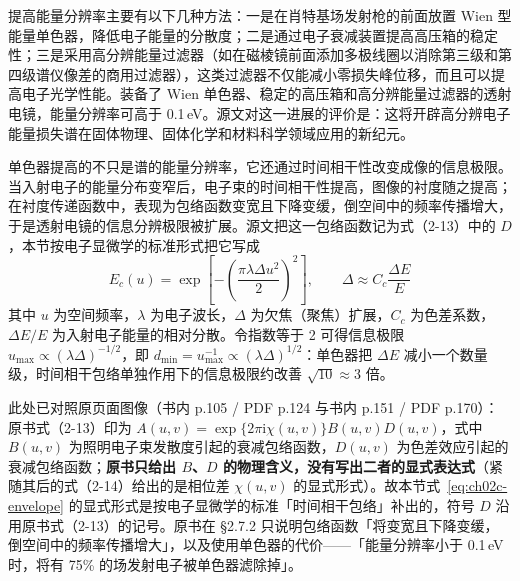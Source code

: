 提高能量分辨率主要有以下几种方法：一是在肖特基场发射枪的前面放置 Wien 型能量单色器，降低电子能量的分散度；二是通过电子衰减装置提高高压箱的稳定性；三是采用高分辨能量过滤器（如在磁棱镜前面添加多极线圈以消除第三级和第四级谱仪像差的商用过滤器），这类过滤器不仅能减小零损失峰位移，而且可以提高电子光学性能。装备了 Wien 单色器、稳定的高压箱和高分辨能量过滤器的透射电镜，能量分辨率可高于 0.1\,eV。源文对这一进展的评价是：这将开辟高分辨电子能量损失谱在固体物理、固体化学和材料科学领域应用的新纪元。

\begin{principle}
单色器提高的不只是谱的能量分辨率，它还通过时间相干性改变成像的信息极限。当入射电子的能量分布变窄后，电子束的时间相干性提高，图像的衬度随之提高；在衬度传递函数中，表现为包络函数变宽且下降变缓，倒空间中的频率传播增大，于是透射电镜的信息分辨极限被扩展。源文把这一包络函数记为式（2-13）中的 $D$，本节按电子显微学的标准形式把它写成
\begin{equation}
E_c(u)=\exp\!\left[-\left(\frac{\pi\lambda\Delta u^{2}}{2}\right)^{2}\right],
\qquad
\Delta \approx C_c\frac{\Delta E}{E}
\label{eq:ch02c-envelope}
\end{equation}
其中 $u$ 为空间频率，$\lambda$ 为电子波长，$\Delta$ 为欠焦（聚焦）扩展，$C_c$ 为色差系数，$\Delta E/E$ 为入射电子能量的相对分散。令指数等于 2 可得信息极限 $u_{\max}\propto(\lambda\Delta)^{-1/2}$，即 $d_{\min}=u_{\max}^{-1}\propto(\lambda\Delta)^{1/2}$：单色器把 $\Delta E$ 减小一个数量级，时间相干包络单独作用下的信息极限约改善 $\sqrt{10}\approx 3$ 倍。
\end{principle}

此处已对照原页面图像（书内 p.105 / PDF p.124 与书内 p.151 / PDF p.170）：原书式（2-13）印为 $A(u,v)=\exp\{2\pi\mathrm{i}\chi(u,v)\}B(u,v)D(u,v)$，式中 $B(u,v)$ 为照明电子束发散度引起的衰减包络函数，$D(u,v)$ 为色差效应引起的衰减包络函数；\textbf{原书只给出 $B$、$D$ 的物理含义，没有写出二者的显式表达式}（紧随其后的式（2-14）给出的是相位差 $\chi(u,v)$ 的显式形式）。故本节式~\eqref{eq:ch02c-envelope} 的显式形式是按电子显微学的标准「时间相干包络」补出的，符号 $D$ 沿用原书式（2-13）的记号。原书在 §2.7.2 只说明包络函数「将变宽且下降变缓，倒空间中的频率传播增大」，以及使用单色器的代价——「能量分辨率小于 0.1\,eV 时，将有 75\% 的场发射电子被单色器滤除掉」。

